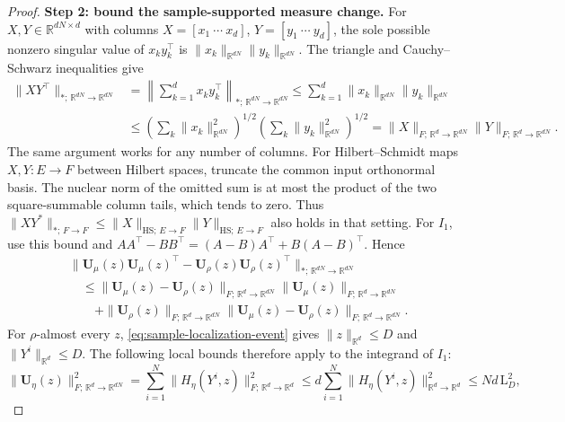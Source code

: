 \begin{proof}
\par\noindent\textbf{Step 2: bound the sample-supported measure change.}
For $X,Y\in\mathbb R^{dN\times d}$ with columns
$X=[x_1\ \cdots\ x_d]$, $Y=[y_1\ \cdots\ y_d]$, the sole possible nonzero singular value of
$x_ky_k^\top$ is $\|x_k\|_{\mathbb R^{dN}}\|y_k\|_{\mathbb R^{dN}}$. The triangle and Cauchy--Schwarz inequalities give
\begin{equation}
\label{eq:nuclear-hilbert-schmidt-product}
\begin{aligned}
 \|XY^\top\|_{*;\,\mathbb R^{dN}\to\mathbb R^{dN}}
 &=\left\|\sum_{k=1}^d x_ky_k^\top\right\|_{*;\,\mathbb R^{dN}\to\mathbb R^{dN}}
 \le\sum_{k=1}^d\|x_k\|_{\mathbb R^{dN}}\|y_k\|_{\mathbb R^{dN}}\\
 &\le\left(\sum_k\|x_k\|_{\mathbb R^{dN}}^2\right)^{1/2}
       \left(\sum_k\|y_k\|_{\mathbb R^{dN}}^2\right)^{1/2}
 =\|X\|_{F;\,\mathbb R^d\to\mathbb R^{dN}}\|Y\|_{F;\,\mathbb R^d\to\mathbb R^{dN}}.
\end{aligned}
\end{equation}
The same argument works for any number of columns. For Hilbert--Schmidt
maps $X,Y:E\to F$ between Hilbert spaces, truncate the common input
orthonormal basis. The nuclear norm
of the omitted sum is at most the product of the two square-summable
column tails, which tends to zero. Thus
$\|XY^*\|_{*;\,F\to F}\le\|X\|_{\mathrm{HS};\,E\to F}\|Y\|_{\mathrm{HS};\,E\to F}$ also holds in that setting.
For $I_1$, use this bound and
$AA^\top-BB^\top=(A-B)A^\top+B(A-B)^\top$.
Hence
\begin{align*}
 &\|\mathbf U_\mu(z)\mathbf U_\mu(z)^\top
          -\mathbf U_\rho(z)\mathbf U_\rho(z)^\top
    \|_{*;\,\mathbb R^{dN}\to\mathbb R^{dN}}\\
 &\quad\le\|\mathbf U_\mu(z)-\mathbf U_\rho(z)\|_{F;\,\mathbb R^d\to\mathbb R^{dN}}
       \|\mathbf U_\mu(z)\|_{F;\,\mathbb R^d\to\mathbb R^{dN}}\\
 &\qquad+\|\mathbf U_\rho(z)\|_{F;\,\mathbb R^d\to\mathbb R^{dN}}
       \|\mathbf U_\mu(z)-\mathbf U_\rho(z)\|_{F;\,\mathbb R^d\to\mathbb R^{dN}}.
\end{align*}
For $\rho$-almost every $z$, \eqref{eq:sample-localization-event} gives
$\|z\|_{\mathbb R^d}\le D$ and $\|Y^i\|_{\mathbb R^d}\le D$. The following local bounds therefore
apply to the integrand of $I_1$:
\[
\|\mathbf U_\eta(z)\|_{F;\,\mathbb R^d\to\mathbb R^{dN}}^2
=
\sum_{i=1}^N \|H_\eta(Y^i,z)\|_{F;\,\mathbb R^d\to\mathbb R^d}^2
\le
d\sum_{i=1}^N \|H_\eta(Y^i,z)\|_{\mathbb R^d\to\mathbb R^d}^2
\le
Nd\,\mathrm L_D^2,
\]

\end{proof}
